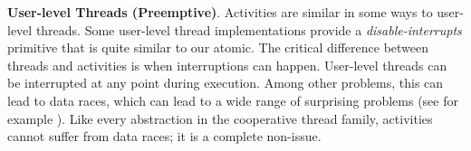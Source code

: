 \documentclass[preprint, 10pt, numbers]{sigplanconf}
\begin{document}






\textbf{User-level Threads (Preemptive)}.
Activities are similar in some ways to user-level threads.
Some user-level thread implementations provide a \emph{disable-interrupts} primitive that is quite similar to our atomic.
The critical difference between threads and activities is when interruptions can happen.
User-level threads can be interrupted at any point during execution.
Among other problems, this can lead to data races, which can lead to a wide range of surprising problems (see for example \cite{Boehm2011}).
Like every abstraction in the cooperative thread family, activities cannot suffer from data races; it is a complete non-issue.
\end{document}
